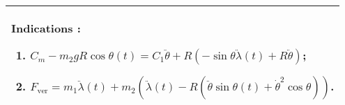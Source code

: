 \ifprof
\else
\ifcolle
\else

\footnotesize
\begin{marginfigure}
\begin{tabular}{|p{.9\linewidth}|}
\hline
Indications :
\begin{enumerate}
\item $ C_m-m_2 g R  \cos\theta(t) = C_1  \ddot{\theta} + R\left( -\sin \theta \ddot{\lambda}(t) + R \ddot{\theta} \right)$;
\item $F_{\text{ver}}=m_1\ddot{\lambda}(t)+m_2\left(\ddot{\lambda}(t)- R \left(\ddot{\theta} \sin\theta(t)  + \dot{\theta}^2 \cos\theta \right)\right)$. 
\end{enumerate} \\ \hline
\end{tabular}
\end{marginfigure}
\normalsize
\fi



\fi